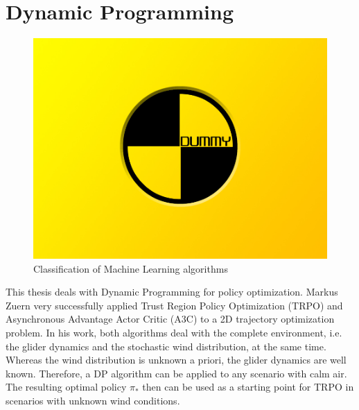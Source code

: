 \chapter{Dynamic Programming}
\label{chapter3}

\begin{figure}[h]
	\includegraphics[width=\textwidth]{src/pics/dummy.jpg}
	\caption{Classification of Machine Learning algorithms}
	\label{fig:model-based-model-free} 
\end{figure}

This thesis deals with Dynamic Programming for policy optimization. Markus Zuern very successfully applied Trust Region Policy Optimization (TRPO) and Asynchronous Advantage Actor Critic (A3C) to a 2D trajectory optimization problem\cite{Zuern2017}. In his work, both algorithms deal with the complete environment, i.e. the glider dynamics and the stochastic wind distribution, at the same time. Whereas the wind distribution is unknown a priori, the glider dynamics are well known. Therefore, a DP algorithm can be applied to any scenario with calm air. The resulting optimal policy $\pi_*$ then can be used as a starting point for TRPO in scenarios with unknown wind conditions.

